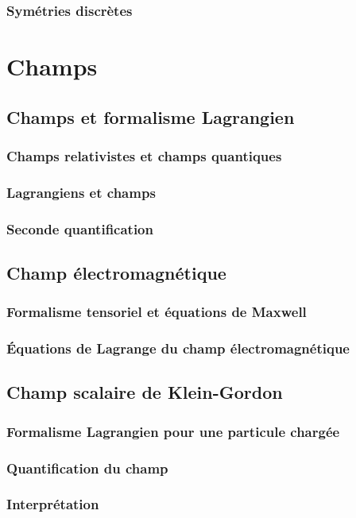 \documentclass{article}
\begin{document}
			\subsubsection{Symétries discrètes}
	\section{Champs}
		\subsection{Champs et formalisme Lagrangien}
			\subsubsection{Champs relativistes et champs quantiques}
			\subsubsection{Lagrangiens et champs}
			\subsubsection{Seconde quantification}
		\subsection{Champ électromagnétique}
			\subsubsection{Formalisme tensoriel et équations de Maxwell}
			\subsubsection{Équations de Lagrange du champ électromagnétique}
		\subsection{Champ scalaire de Klein-Gordon}
			\subsubsection{Formalisme Lagrangien pour une particule chargée}
			\subsubsection{Quantification du champ}
			\subsubsection{Interprétation}
\end{document}
